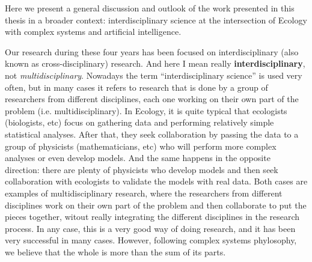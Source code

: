 
Here we present a general discussion and outlook of the work presented in this
thesis in a broader context: interdisciplinary science at the intersection of
Ecology with complex systems and artificial intelligence.


Our research during these four years has been focused on interdisciplinary
(also known as cross-disciplinary) research. And here I mean really
\textbf{interdisciplinary}, not \textit{multidisciplinary}. Nowadays the term
``interdisciplinary science'' is used very often, but in many cases it refers
to research that is done by a group of researchers from different disciplines,
each one working on their own part of the problem (i.e. multidisciplinary). In
Ecology, it is quite typical that ecologists (biologists, etc) focus on
gathering data and performing relatively simple statistical analyses. After
that, they seek collaboration by passing the data to a group of physicists
(mathematicians, etc) who will perform more complex analyses or even develop
models. And the same happens in the opposite direction: there are plenty of
physicists who develop models and then seek collaboration with ecologists to
validate the models with real data. Both cases are examples of
multidisciplinary research, where the researchers from different disciplines
work on their own part of the problem and then collaborate to put the pieces
together, witout really integrating the different disciplines in the research
process. In any case, this is a very good way of doing research, and it has
been very successful in many cases. However, following complex systems
phylosophy, we believe that the whole is more than the sum of its parts.

